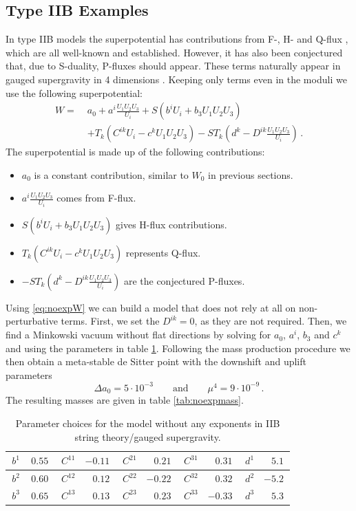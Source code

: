 \documentclass[a4paper,12pt]{report}
\newcommand{\be}{\begin{equation}}
\newcommand{\ee}{\end{equation}}
\newcommand{\bea}{\begin{equation}\begin{aligned}}
\newcommand{\eea}{\end{aligned}\end{equation}}
\begin{document}
\subsection{Type IIB Examples}
In type IIB models the superpotential has contributions from F-, H- and Q-flux \cite{Aldazabal:2006up,Dibitetto:2011gm,Blaback:2013ht}, which are all well-known and established. However, it has also been conjectured that, due to S-duality, P-fluxes should appear. These terms naturally appear in gauged supergravity in 4 dimensions \cite{Dibitetto:2011gm}. Keeping only terms even in the moduli we use the following superpotential:
\bea
\label{eq:noexpW}
W =\; &a_0 + a^i \frac{U_1 U_2 U_3}{U_i} + S \left( b^i U_i + b_3 U_1 U_2 U_3 \right) \\
&+ T_k \left( C^{ik}U_i - c^k U_1 U_2 U_3\right) - S T_k \left( d^k -D^{ik}\frac{U_1 U_2 U_3}{U_i}\right)\,.
\eea
The superpotential is made up of the following contributions:
\begin{itemize}
\item $a_0$ is a constant contribution, similar to $W_0$ in previous sections.
\item $a^i \frac{U_1 U_2 U_3}{U_i}$ comes from F-flux.
\item $S \left( b^i U_i + b_3 U_1 U_2 U_3 \right)$ gives H-flux contributions.
\item $T_k \left( C^{ik}U_i - c^k U_1 U_2 U_3\right)$ represents Q-flux.
\item $- S T_k \left( d^k -D^{ik}\frac{U_1 U_2 U_3}{U_i}\right)$ are the conjectured P-fluxes.
\end{itemize}
Using \eqref{eq:noexpW} we can build a model that does not rely at all on non-perturbative terms. First, we set the $D^{ik}=0$, as they are not required. Then, we find a Minkowski vacuum without flat directions by solving for $a_0$, $a^i$, $b_3$ and $c^k$ and using the parameters in table \ref{tab:noexppara}. Following the mass production procedure we then obtain a meta-stable de Sitter point with the downshift and uplift parameters
\be 
\Delta a_0 = 5 \cdot 10^{-3}\qquad \text{and} \qquad \mu^4 = 9\cdot 10^{-9}\,.
\ee
The resulting masses are given in table \ref{tab:noexpmass}.
\begin{table}[htb]
\center
\begin{tabular}{|r|r||r|r||r|r||r|r||r|r|}\hline
$\,b^{1}$ & $\, 0.55 \,$  & $\,C^{11}$ & $ -0.11 \,$ & $\,C^{21}$ & $\, 0.21 \,$ & $\,C^{31}$ & $\, 0.31 \,$ & $\,d^{1}$ & $\, 5.1 \,$ \\\hline
$\,b^{2}$ & $\, 0.60 \,$ & $\,C^{12}$ & $\, 0.12 \,$ & $\,C^{22}$ & $ -0.22 \,$ & $\,C^{32}$ & $\, 0.32 \,$ & $\,d^{2}$ & $ -5.2 \,$ \\\hline
$\,b^{3}$ & $\, 0.65 \,$ & $\,C^{13}$ & $\, 0.13 \,$ & $\,C^{23}$ & $\, 0.23 \,$ & $\,C^{33}$ & $ -0.33 \,$ & $\,d^{3}$ & $\, 5.3 \,$ \\\hline
\end{tabular}
\caption{Parameter choices for the model without any exponents in IIB string theory/gauged supergravity.}
\label{tab:noexppara}
\end{table}
\end{document}
